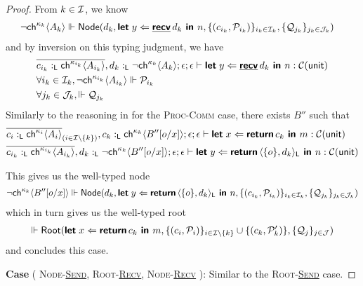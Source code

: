 \begin{proof}
  \noindent
  From $k \in \mathcal{I}$, we know
  \begin{align*}
    & \neg{\textsf{ch}^{\kappa_k}\langle{A_k}\rangle} \Vdash 
      \textsf{Node}({d_k}, {
        \textbf{\textsf{let}}\;{y}\Leftarrow{\underline{\textbf{\textsf{recv}}}\,{d_k}}\textbf{\textsf{ in }}{n}
      }, {
        \{ ( c_{i_k}, \mathcal{P}_{i_k} ) \}_{i_k \in \mathcal{I}_k},
        \{ \mathcal{Q}_{j_k} \}_{j_k \in \mathcal{J}_k}
      })
  \end{align*}
  and by inversion on this typing judgment, we have
  \begin{align*}
    & \overline{c_{i_k} :_{\textsf{L}} \textsf{ch}^{\kappa_{i_k}}\langle{A_{i_k}}\rangle}, d_k :_{\textsf{L}} \neg{\textsf{ch}^{\kappa_k}\langle{A_k}\rangle} ; 
      \epsilon ; \epsilon \vdash
      \textbf{\textsf{let}}\;{y}\Leftarrow{\underline{\textbf{\textsf{recv}}}\,{d_k}}\textbf{\textsf{ in }}{n} : 
      \mathcal{C}({\textsf{unit}}) \\
    & \forall i_k \in \mathcal{I}_k, \neg{\textsf{ch}^{\kappa_{i_k}}\langle{A_{i_k}}\rangle} \Vdash \mathcal{P}_{i_k} \\
    & \forall j_k \in \mathcal{J}_k, \Vdash \mathcal{Q}_{j_k}
  \end{align*}
  Similarly to the reasoning in  for the 
  \textsc{Proc-Comm} case, there exists $B''$ such that
  \begin{align*}
    &\overline{c_i :_{\textsf{L}} \textsf{ch}^{\kappa_i}\langle{A_i}\rangle}_{(i \in \mathcal{I} \setminus \{k\})}, 
     c_k :_{\textsf{L}} \textsf{ch}^{\kappa_k}\langle{B''[o/x]}\rangle ; \epsilon ; \epsilon \vdash 
     \textbf{\textsf{let}}\;{x}\Leftarrow{\textbf{\textsf{return}}\,{c_k}}\textbf{\textsf{ in }}{m} : \mathcal{C}({\textsf{unit}})
    \\
    &\overline{c_{i_k} :_{\textsf{L}} \textsf{ch}^{\kappa_{i_k}}\langle{A_{i_k}}\rangle}, 
     d_k :_{\textsf{L}} \neg{\textsf{ch}^{\kappa_k}\langle{B''[o/x]}\rangle} ; \epsilon ; \epsilon \vdash
     \textbf{\textsf{let}}\;{y}\Leftarrow{\textbf{\textsf{return}}\,{\langle{\{{o}\},{d_k}}\rangle_{\textsf{L}}}}\textbf{\textsf{ in }}{n} : 
     \mathcal{C}({\textsf{unit}})
  \end{align*}

  \noindent
  This gives us the well-typed node
  \begin{align*}
    \neg{\textsf{ch}^{\kappa_k}\langle{B''[o/x]}\rangle} \Vdash
    \textsf{Node}({d_k}, {
      \textbf{\textsf{let}}\;{y}\Leftarrow{\textbf{\textsf{return}}\,{\langle{\{{o}\},{d_k}}\rangle_{\textsf{L}}}}\textbf{\textsf{ in }}{n}
    }, {
      \{ ( c_{i_k}, \mathcal{P}_{i_k} ) \}_{i_k \in \mathcal{I}_k},
      \{ \mathcal{Q}_{j_k} \}_{j_k \in \mathcal{J}_k}
    })
  \end{align*}
  which in turn gives us the well-typed root
  \begin{align*}
    \Vdash \textsf{Root}({
      \textbf{\textsf{let}}\;{x}\Leftarrow{
        \textbf{\textsf{return}}\,{c_k}
      }\textbf{\textsf{ in }}{m} 
    }, {
      \{ (c_i, \mathcal{P}_i) \}_{i \in \mathcal{I} \setminus \{ k \}} \cup \{ (c_k, \mathcal{P}_k') \},
      \{ \mathcal{Q}_j \}_{j \in \mathcal{J}}
    })
  \end{align*}
  and concludes this case.

\noindent
\textbf{Case} (
  \textsc{Node-\underline{Send}}, 
  \textsc{Root-\underline{Recv}}, 
  \textsc{Node-\underline{Recv}}
): Similar to the \textsc{Root-\underline{Send}} case.

\end{proof}
